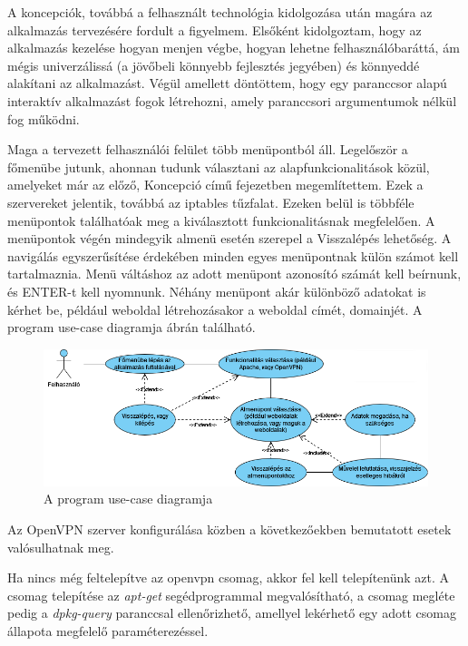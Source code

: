 
A koncepciók, továbbá a felhasznált technológia kidolgozása után magára az alkalmazás tervezésére fordult a figyelmem. Elsőként kidolgoztam, hogy az alkalmazás kezelése hogyan menjen végbe, hogyan lehetne felhasználóbaráttá, ám mégis univerzálissá (a jövőbeli könnyebb fejlesztés jegyében) és könnyeddé alakítani az alkalmazást. Végül amellett döntöttem, hogy egy paranccsor alapú interaktív alkalmazást fogok létrehozni, amely paranccsori argumentumok nélkül fog működni.


Maga a tervezett felhasználói felület több menüpontból áll. Legelőször a főmenübe jutunk, ahonnan tudunk választani az alapfunkcionalitások közül, amelyeket már az előző, Koncepció című fejezetben megemlítettem. Ezek a szervereket jelentik, továbbá az iptables tűzfalat. Ezeken belül is többféle menüpontok találhatóak meg a kiválasztott funkcionalitásnak megfelelően. A menüpontok végén mindegyik almenü esetén szerepel a Visszalépés lehetőség. A navigálás egyszerűsítése érdekében minden egyes menüpontnak külön számot kell tartalmaznia. Menü váltáshoz az adott menüpont azonosító számát kell beírnunk, és ENTER-t kell nyomnunk. Néhány menüpont akár különböző adatokat is kérhet be, például weboldal létrehozásakor a weboldal címét, domainjét.
A program use-case diagramja  ábrán található.

\begin{figure}[!h]
\centering
\includegraphics[width=0.73\paperwidth]{images/usecase_diagram.png}
\caption{A program use-case diagramja}
\label{fig:usecase_diagram}
\end{figure}

\pagebreak


Az OpenVPN szerver konfigurálása közben a következőekben bemutatott esetek valósulhatnak meg. 

Ha nincs még feltelepítve az openvpn csomag, akkor fel kell telepítenünk azt. A csomag telepítése az \textit{apt-get} segédprogrammal megvalósítható, a csomag megléte pedig a \textit{dpkg-query} paranccsal ellenőrizhető, amellyel lekérhető egy adott csomag állapota megfelelő paraméterezéssel.

